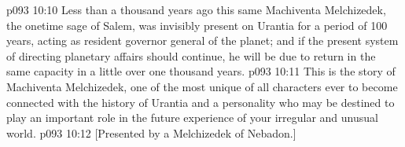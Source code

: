\vs p093 10:10 Less than a thousand years ago this same Machiventa Melchizedek, the onetime sage of Salem, was invisibly present on Urantia for a period of 100 years, acting as resident governor general of the planet; and if the present system of directing planetary affairs should continue, he will be due to return in the same capacity in a little over one thousand years.
\vs p093 10:11 \pc This is the story of Machiventa Melchizedek, one of the most unique of all characters ever to become connected with the history of Urantia and a personality who may be destined to play an important role in the future experience of your irregular and unusual world.
\vsetoff
\vs p093 10:12 [Presented by a Melchizedek of Nebadon.]
\quizlink
